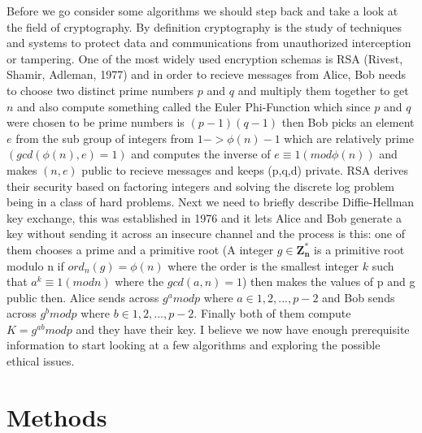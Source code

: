 \documentclass{article}
\begin{document}
Before we go consider some algorithms we should step back and take a look at the field of cryptography. By definition cryptography is the study of techniques and systems to protect data and communications from unauthorized interception or tampering\cite{Washington2006}. One of the most widely used encryption schemas is RSA (Rivest, Shamir, Adleman, 1977) and in order to recieve messages from Alice, Bob needs to choose two distinct prime numbers $p$ and $q$ and multiply them together to get $n$ and also compute something called the Euler Phi-Function which since $p$ and $q$ were chosen to be prime numbers is $(p-1)(q-1)$\cite{Kenneth2011} then Bob picks an element $e$ from the sub group of integers from $1 -> \phi(n)-1$ which are relatively prime $(gcd(\phi(n),e)=1)$ and computes the inverse of $e \equiv 1 (mod \phi(n))$ and makes $(n,e)$ public to recieve messages and keeps (p,q,d) private. RSA derives their security based on factoring integers and solving the discrete log problem being in a class of hard problems. Next we need to briefly describe Diffie-Hellman key exchange\cite{Washington2006}, this was established in 1976 and it lets Alice and Bob generate a key without sending it across an insecure channel and the process is this: one of them chooses a prime and a primitive root (A integer $g \in \mathbf{Z_n^{*}}$ is a primitive root modulo n if $ord_n(g) = \phi(n)$ where the order is the smallest integer $k$ such that $a^k \equiv 1 (mod n)$ where the $gcd(a,n) = 1$) then makes the values of p and g public then. Alice sends across $g^a mod p$ where $a \in {1,2,...,p-2}$ and Bob sends across $g^b mod p $ where $b \in {1,2,...,p-2}$. Finally both of them compute $K = g^{ab} mod p$ and they have their key. I believe we now have enough prerequisite information to start looking at a few algorithms and exploring the possible ethical issues.  

\section{Methods}
\end{document}

